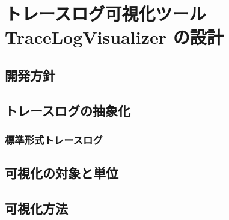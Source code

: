 \chapter{トレースログ可視化ツール TraceLogVisualizer の設計}

\section{開発方針}

\section{トレースログの抽象化}

\subsection{標準形式トレースログ}

\section{可視化の対象と単位}

\section{可視化方法}